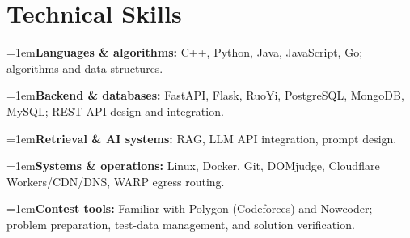\documentclass[10pt,a4paper]{article}
\newcommand{\skillrow}[2]{%
  \par\noindent\hangindent=1em\hangafter=1\textbf{#1: }#2\par
}
\begin{document}
\section{Technical Skills}
\skillrow{Languages \& algorithms}{C++, Python, Java, JavaScript, Go; algorithms and data structures.}
\skillrow{Backend \& databases}{FastAPI, Flask, RuoYi, PostgreSQL, MongoDB, MySQL; REST API design and integration.}
\skillrow{Retrieval \& AI systems}{RAG, LLM API integration, prompt design.}
\skillrow{Systems \& operations}{Linux, Docker, Git, DOMjudge, Cloudflare Workers/CDN/DNS, WARP egress routing.}
\skillrow{Contest tools}{Familiar with Polygon (Codeforces) and Nowcoder; problem preparation, test-data management, and solution verification.}
\end{document}
